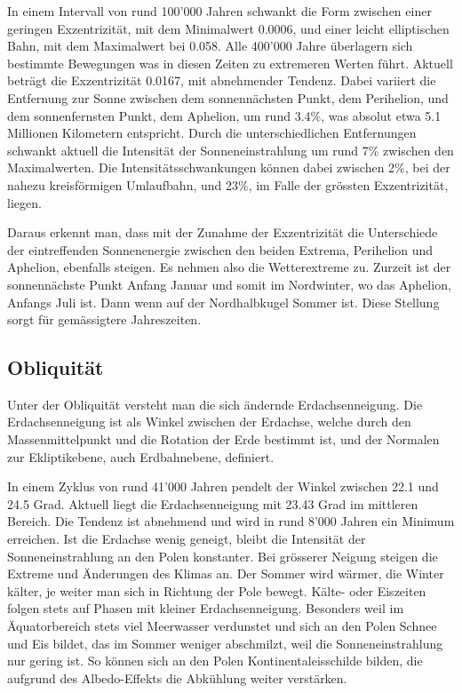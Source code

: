 In einem Intervall von rund 100'000 Jahren schwankt die Form zwischen einer geringen Exzentrizität, mit dem Minimalwert 0.0006, und einer leicht elliptischen Bahn, mit dem Maximalwert bei 0.058.
Alle 400'000 Jahre überlagern sich bestimmte Bewegungen was in diesen Zeiten zu extremeren Werten führt.
Aktuell beträgt die Exzentrizität 0.0167, mit abnehmender Tendenz.
Dabei variiert die Entfernung zur Sonne zwischen dem sonnennächsten Punkt, dem Perihelion, und dem sonnenfernsten Punkt, dem Aphelion, um rund 3.4\%, was absolut etwa 5.1 Millionen Kilometern entspricht.
Durch die unterschiedlichen Entfernungen schwankt aktuell die Intensität der Sonneneinstrahlung um rund 7\% zwischen den Maximalwerten.
Die Intensitätsschwankungen können dabei zwischen 2\%, bei der nahezu kreisförmigen Umlaufbahn, und 23\%, im Falle der grössten Exzentrizität, liegen.

Daraus erkennt man, dass mit der Zunahme der Exzentrizität die Unterschiede der eintreffenden Sonnenenergie zwischen den beiden Extrema, Perihelion und Aphelion, ebenfalls steigen.
Es nehmen also die Wetterextreme zu.
Zurzeit ist der sonnennächste Punkt Anfang Januar und somit im Nordwinter, wo das Aphelion, Anfangs Juli ist.
Dann wenn auf der Nordhalbkugel Sommer ist.
Diese Stellung sorgt für gemässigtere Jahreszeiten. 

\subsection{Obliquität
\label{milankovic:subsection:Obliquität}}
Unter der Obliquität versteht man die sich ändernde Erdachsenneigung.
Die Erdachsenneigung ist als Winkel zwischen der Erdachse, welche durch den Massenmittelpunkt und die Rotation der Erde bestimmt ist, und der Normalen zur Ekliptikebene, auch Erdbahnebene, definiert.

In einem Zyklus von rund 41'000 Jahren pendelt der Winkel zwischen 22.1 und 24.5 Grad.
Aktuell liegt die Erdachsenneigung mit 23.43 Grad im mittleren Bereich.
Die Tendenz ist abnehmend und wird in rund 8’000 Jahren ein Minimum erreichen.
Ist die Erdachse wenig geneigt, bleibt die Intensität der Sonneneinstrahlung an den Polen konstanter.
Bei grösserer Neigung steigen die Extreme und Änderungen des Klimas an.
Der Sommer wird wärmer, die Winter kälter, je weiter man sich in Richtung der Pole bewegt.
Kälte- oder Eiszeiten folgen stets auf Phasen mit kleiner Erdachsenneigung.
Besonders weil im Äquatorbereich stets viel Meerwasser verdunstet und sich an den Polen Schnee und Eis bildet, das im Sommer weniger abschmilzt, weil die Sonneneinstrahlung nur gering ist.
So können sich an den Polen Kontinentaleisschilde bilden, die aufgrund des Albedo-Effekts die Abkühlung weiter verstärken.

